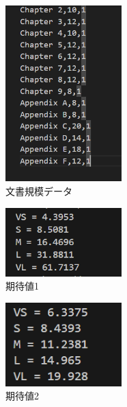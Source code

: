 \documentclass[titlepage,a4paper,12pt]{ltjsreport}
\begin{document}
\begin{enumerate}
    \begin{figure}[H]
        \centering
        \includegraphics[width=0.4\textwidth]{../picture/課題4/4data2.png}
        \caption{文書規模データ}
        \label{testdata2}
    \end{figure}

    \begin{figure}[H]
        \centering
        \includegraphics[width=0.4\textwidth]{../picture/課題4/kitaiti1copy.png}
        \caption{期待値1}
        \label{testkitaiti1}
    \end{figure}
    
    \begin{figure}[H]
        \centering
        \includegraphics[width=0.4\textwidth]{../picture/課題4/kitaiti2.png}
        \caption{期待値2}
        \label{testkitaiti2}
    \end{figure}
    
     

\end{enumerate}
\end{document}
